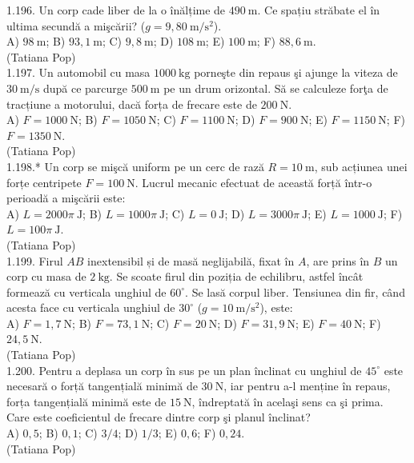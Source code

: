 1.196. Un corp cade liber de la o înălțime de $490 \mathrm{~m}$. Ce spațiu străbate el în ultima secundă a mişcării? ($g=9,80 \mathrm{~m} / \mathrm{s}^{2}$).\\ A) $98 \mathrm{~m}$; B) $93,1 \mathrm{~m}$; C) $9,8 \mathrm{~m}$; D) $108 \mathrm{~m}$; E) $100 \mathrm{~m}$; F) $88,6 \mathrm{~m}$.\\ (Tatiana Pop)\\

1.197. Un automobil cu masa $1000 \mathrm{~kg}$ porneşte din repaus şi ajunge la viteza de $30 \mathrm{~m} / \mathrm{s}$ după ce parcurge $500 \mathrm{~m}$ pe un drum orizontal. Să se calculeze forţa de tracțiune a motorului, dacă forța de frecare este de $200 \mathrm{~N}$.\\ A) $F=1000 \mathrm{~N}$; B) $F=1050 \mathrm{~N}$; C) $F=1100 \mathrm{~N}$; D) $F=900 \mathrm{~N}$; E) $F=1150 \mathrm{~N}$; F) $F=1350 \mathrm{~N}$.\\ (Tatiana Pop)\\

1.198.* Un corp se mişcă uniform pe un cerc de rază $R=10 \mathrm{~m}$, sub acțiunea unei forțe centripete $F=100 \mathrm{~N}$. Lucrul mecanic efectuat de această forță într-o perioadă a mişcării este:\\ A) $L=2000 \pi \mathrm{~J}$; B) $L=1000 \pi \mathrm{~J}$; C) $L=0 \mathrm{~J}$; D) $L=3000 \pi \mathrm{~J}$; E) $L=1000 \mathrm{~J}$; F) $L=100 \pi \mathrm{~J}$.\\ (Tatiana Pop)\\

1.199. Firul $AB$ inextensibil și de masă neglijabilă, fixat în $A$, are prins în $B$ un corp cu masa de $2 \mathrm{~kg}$. Se scoate firul din poziția de echilibru, astfel încât formează cu verticala unghiul de $60^{\circ}$. Se lasă corpul liber. Tensiunea din fir, când acesta face cu verticala unghiul de $30^{\circ}$ ($g=10 \mathrm{~m} / \mathrm{s}^{2}$), este:\\ A) $F=1,7 \mathrm{~N}$; B) $F=73,1 \mathrm{~N}$; C) $F=20 \mathrm{~N}$; D) $F=31,9 \mathrm{~N}$; E) $F=40 \mathrm{~N}$; F) $24,5 \mathrm{~N}$.\\ (Tatiana Pop)\\

1.200. Pentru a deplasa un corp în sus pe un plan înclinat cu unghiul de $45^{\circ}$ este necesară o forță tangențială minimă de $30 \mathrm{~N}$, iar pentru a-l menține în repaus, forța tangențială minimă este de $15 \mathrm{~N}$, îndreptată în acelaşi sens ca şi prima. Care este coeficientul de frecare dintre corp şi planul înclinat?\\ A) $0,5$; B) $0,1$; C) $3 / 4$; D) $1 / 3$; E) $0,6$; F) $0,24$.\\ (Tatiana Pop)\\

